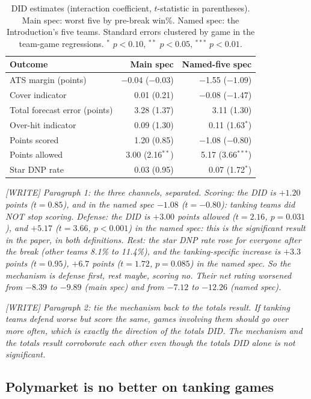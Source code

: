 \documentclass[12pt,letterpaper]{article}
\newcommand{\writeprompt}[1]{{\color{gray}\textit{[WRITE] #1}}}
\begin{document}
\begin{table}[htbp]
\centering
\caption{DID estimates (interaction coefficient, $t$-statistic in
parentheses). Main spec: worst five by pre-break win\%. Named spec: the
Introduction's five teams. Standard errors clustered by game in the
team-game regressions. $^{*}$ $p<0.10$, $^{**}$ $p<0.05$, $^{***}$ $p<0.01$.}
\label{tab:did}
\begin{tabular}{lrr}
\hline
Outcome & Main spec & Named-five spec \\
\hline
ATS margin (points) & $-$0.04 ($-0.03$) & $-$1.55 ($-1.09$) \\
Cover indicator & 0.01 (0.21) & $-$0.08 ($-1.47$) \\
Total forecast error (points) & 3.28 (1.37) & 3.11 (1.30) \\
Over-hit indicator & 0.09 (1.30) & 0.11 (1.63$^{*}$) \\
Points scored & 1.20 (0.85) & $-$1.08 ($-0.80$) \\
Points allowed & 3.00 (2.16$^{**}$) & 5.17 (3.66$^{***}$) \\
Star DNP rate & 0.03 (0.95) & 0.07 (1.72$^{*}$) \\
\hline
\end{tabular}
\end{table}

\writeprompt{Paragraph 1: the three channels, separated. Scoring: the DID is
$+1.20$ points ($t=0.85$), and in the named spec $-1.08$ ($t=-0.80$):
tanking teams did NOT stop scoring. Defense: the DID is $+3.00$ points
allowed ($t=2.16$, $p=0.031$), and $+5.17$ ($t=3.66$, $p<0.001$) in the named
spec: this is the significant result in the paper, in both definitions.
Rest: the star DNP rate rose for everyone after the break (other teams 8.1\%
to 11.4\%), and the tanking-specific increase is $+3.3$ points ($t=0.95$),
$+6.7$ points ($t=1.72$, $p=0.085$) in the named spec. So the mechanism is
defense first, rest maybe, scoring no. Their net rating worsened from
$-8.39$ to $-9.89$ (main spec) and from $-7.12$ to $-12.26$ (named spec).}

\writeprompt{Paragraph 2: tie the mechanism back to the totals result. If
tanking teams defend worse but score the same, games involving them should
go over more often, which is exactly the direction of the totals DID. The
mechanism and the totals result corroborate each other even though the
totals DID alone is not significant.}

\subsection{Polymarket is no better on tanking games}
\end{document}
